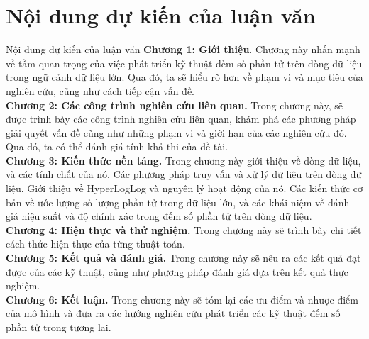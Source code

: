 \documentclass[10pt]{beamer}
\begin{document}
\section{Nội dung dự kiến của luận văn}
\begin{frame}{Nội dung dự kiến của luận văn}
  \textbf{Chương 1: Giới thiệu}. Chương này nhấn mạnh về tầm quan trọng của việc phát triển kỹ thuật đếm số phần tử trên dòng dữ liệu trong ngữ cảnh 
  dữ liệu lớn. Qua đó, ta sẽ hiểu rõ hơn về phạm vi và mục tiêu của nghiên cứu, cũng như cách tiếp cận vấn đề.\\
  \textbf{Chương 2: Các công trình nghiên cứu liên quan.} Trong chương này, sẽ được trình bày các công trình nghiên cứu liên quan, khám phá các 
  phương pháp giải quyết vấn đề cũng như những phạm vi và giới hạn của các nghiên cứu đó. Qua đó, ta có thể đánh giá tính khả thi của đề tài.\\
  \textbf{Chương 3: Kiến thức nền tảng.} Trong chương này giới thiệu về dòng dữ liệu, và các tính chất của nó.
  Các phương pháp truy vấn và xử lý dữ liệu trên dòng dữ liệu. Giới thiệu về HyperLogLog và nguyên lý hoạt động của nó. Các kiến thức cơ bản về ước lượng số lượng phần tử trong dữ liệu lớn,
  và các khái niệm về đánh giá hiệu suất và độ chính xác trong đếm số phần tử trên dòng dữ liệu.\\
  \textbf{Chương 4: Hiện thực và thử nghiệm. } Trong chương này sẽ trình bày chi tiết cách thức hiện thực của từng thuật toán.\\
  \textbf{Chương 5: Kết quả và đánh giá.} Trong chương này sẽ nêu ra các kết quả đạt được của các kỹ thuật, cũng như phương pháp đánh giá 
  dựa trên kết quả thực nghiệm.\\
  \textbf{Chương 6: Kết luận.} Trong chương này sẽ tóm lại các ưu điểm và nhược điểm của mô hình và đưa ra các hướng nghiên cứu phát triển 
  các kỹ thuật đếm số phần tử trong tương lai.
\end{frame}
\end{document}

